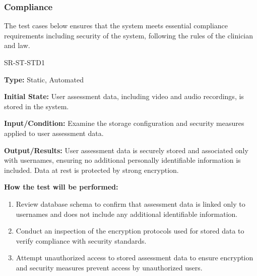 \documentclass[12pt, titlepage]{article}
\begin{document}
\subsubsection{Compliance}

The test cases below ensures that the system meets essential 
compliance requirements including security of the system, following the rules of the clinician and law.
		
\begin{itemize}
  \begin{item}
    SR-ST-STD1
    \begin{mdframed}[linewidth=0.5mm]
      \textbf{Type:} Static, Automated \par
      \textbf{Initial State:} User assessment data, including video and audio recordings, is stored in the system. \par
      \textbf{Input/Condition:} Examine the storage configuration and security measures applied to user assessment data. \par
      \textbf{Output/Results:} User assessment data is securely stored and associated only with usernames, 
      ensuring no additional personally identifiable information is \\ included. Data at rest is protected by strong encryption. \par
      \textbf{How the test will be performed:}
      \begin{enumerate}[noitemsep]
        \item Review database schema to confirm that assessment data is linked only to usernames and does not
         include any additional identifiable information.
        \item Conduct an inspection of the encryption protocols used for stored data to verify compliance with
         security standards.
        \item Attempt unauthorized access to stored assessment data to ensure encryption and security measures
         prevent access by unauthorized users.
      \end{enumerate}
    \end{mdframed}
  \end{item}

\end{itemize}
\end{document}
